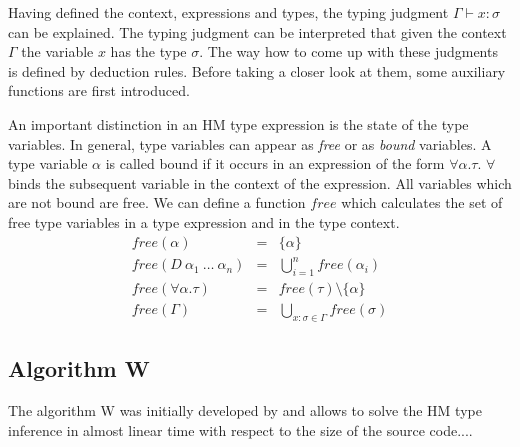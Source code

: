 Having defined the context, expressions and types, the typing judgment $\Gamma \vdash x : \sigma$ can be explained.
The typing judgment can be interpreted that given the context $\Gamma$ the variable $x$ has the type $\sigma$.
The way how to come up with these judgments is defined by deduction rules.
Before taking a closer look at them, some auxiliary functions are first introduced.

An important distinction in an HM type expression is the state of the type variables.
In general, type variables can appear as \emph{free} or as \emph{bound} variables.
A type variable $\alpha$ is called bound if it occurs in an expression of the form $\forall \alpha. \tau$.
$\forall$ binds the subsequent variable in the context of the expression.
All variables which are not bound are free.
We can define a function $free$ which calculates the set of free type variables in a type expression and in the type context.
\begin{eqnarray*}
free(\alpha) &=& \{\alpha\}\\
free(D\ \alpha_1\ \ldots\ \alpha_n) &=& \bigcup_{i=1}^n free(\alpha_i)\\
free(\forall \alpha. \tau) &=& free(\tau) \setminus \{\alpha\}\\
free(\Gamma) &=& \bigcup_{x:\sigma \in \Gamma} free(\sigma)
\end{eqnarray*}

\subsection{Algorithm W}

The algorithm W was initially developed by \cite{damas:1982a} and allows to solve the HM type inference in almost linear time with respect to the size of the source code....



